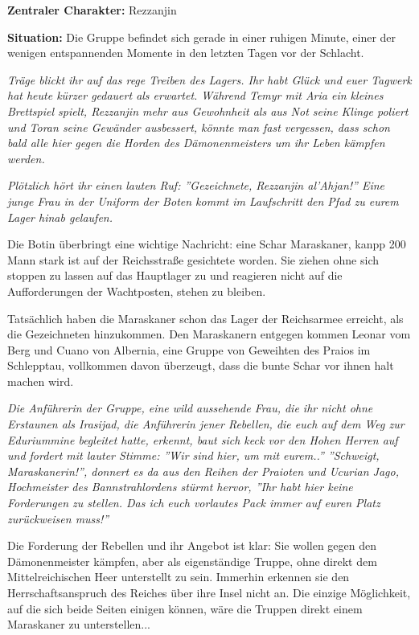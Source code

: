 \textbf{Zentraler Charakter:} Rezzanjin 

\textbf{Situation:} Die Gruppe befindet sich gerade in einer ruhigen Minute, einer der wenigen entspannenden Momente in den letzten Tagen vor der Schlacht. 

\emph{Träge blickt ihr auf das rege Treiben des Lagers. Ihr habt Glück und euer Tagwerk hat heute kürzer gedauert als erwartet. Während Temyr mit Aria ein kleines Brettspiel spielt, Rezzanjin mehr aus Gewohnheit als aus Not seine Klinge poliert und Toran seine Gewänder ausbessert, könnte man fast vergessen, dass schon bald alle hier gegen die Horden des Dämonenmeisters um ihr Leben kämpfen werden.} 

\emph{Plötzlich hört ihr einen lauten Ruf: ''Gezeichnete, Rezzanjin al'Ahjan!'' Eine junge Frau in der Uniform der Boten kommt im Laufschritt den Pfad zu eurem Lager hinab gelaufen.} 

Die Botin überbringt eine wichtige Nachricht: eine Schar Maraskaner, kanpp 200 Mann stark ist auf der Reichsstraße gesichtete worden. Sie ziehen ohne sich stoppen zu lassen auf das Hauptlager zu und reagieren nicht auf die Aufforderungen der Wachtposten, stehen zu bleiben.

Tatsächlich haben die Maraskaner schon das Lager der Reichsarmee erreicht, als die Gezeichneten hinzukommen. Den Maraskanern entgegen kommen Leonar vom Berg und Cuano von Albernia, eine Gruppe von Geweihten des Praios im Schlepptau, vollkommen davon überzeugt, dass die bunte Schar vor ihnen halt machen wird. 

\emph{Die Anführerin der Gruppe, eine wild aussehende Frau, die ihr nicht ohne Erstaunen als Irasijad, die Anführerin jener Rebellen, die euch auf dem Weg zur Eduriummine begleitet hatte, erkennt, baut sich keck vor den Hohen Herren auf und fordert mit lauter Stimme: ''Wir sind hier, um mit eurem..'' ''Schweigt, Maraskanerin!'', donnert es da aus den Reihen der Praioten und Ucurian Jago, Hochmeister des Bannstrahlordens stürmt hervor, ''Ihr habt hier keine Forderungen zu stellen. Das ich euch vorlautes Pack immer auf euren Platz zurückweisen muss!''}

Die Forderung der Rebellen und ihr Angebot ist klar: Sie wollen gegen den Dämonenmeister kämpfen, aber als eigenständige Truppe, ohne direkt dem Mittelreichischen Heer unterstellt zu sein. Immerhin erkennen sie den Herrschaftsanspruch des Reiches über ihre Insel nicht an. Die einzige Möglichkeit, auf die sich beide Seiten einigen können, wäre die Truppen direkt einem Maraskaner zu unterstellen...

